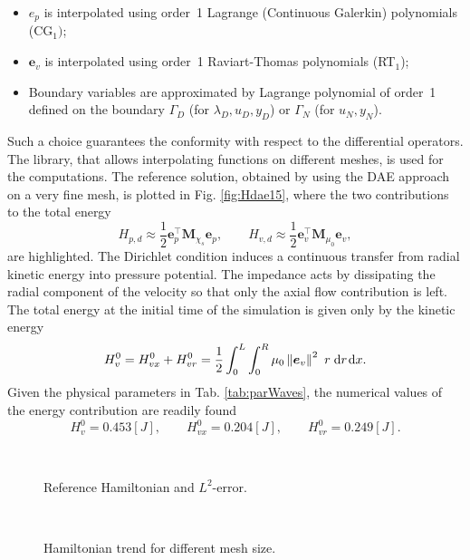 \begin{itemize}
	\item $e_p$ is interpolated using order~1 Lagrange (Continuous Galerkin) polynomials (CG$_1)$;
	\item $\bm{e}_v$ is interpolated using order~1 Raviart-Thomas polynomials (RT$_1$);
	\item Boundary variables are approximated by Lagrange polynomial of order~1 defined on the boundary $\Gamma_D$ (for $\lambda_D, u_D, y_D$) or $\Gamma_N$ (for $u_N, y_N$).
\end{itemize}

Such a choice guarantees the conformity with respect to the differential operators. The {} library, that allows interpolating functions on different meshes, is used for the computations. The reference solution, obtained by using the DAE approach on a very fine mesh, is plotted in Fig. \ref{fig:Hdae15}, where the two contributions to the total energy
\[
H_{p, d} \approx \frac{1}{2} \mathbf{e}_p^\top \mathbf{M}_{\chi_s} \mathbf{e}_p, \qquad H_{v, d} \approx \frac{1}{2} \mathbf{e}_v^\top \mathbf{M}_{\mu_0} \mathbf{e}_v, \]
are highlighted. The Dirichlet condition induces a continuous transfer from radial kinetic energy into pressure potential. The impedance acts by dissipating the radial component of the velocity so that only the axial flow contribution is left. The total energy at the initial time of the simulation is given only by the kinetic energy
\[
H_v^0 = H_{vx}^0 + H_{vr}^0 = \frac{1}{2} \int_{0}^L\int_{0}^R  \mu_0 \norm{\bm{e}_v}^2 \ r \d{r}\d{x}.
\]
Given the physical parameters in Tab. \ref{tab:parWaves}, the numerical values of the energy contribution are readily found
\[H_v^0 = 0.453 [J], \qquad H_{vx}^0 = 0.204 [J], \qquad H_{vr}^0 = 0.249 [J].\]

\begin{figure}[ht]%
	\centering
	\hspace{8pt}%
	 \\
	\caption[]{Reference Hamiltonian and $L^2$-error.}%
	\label{fig:Href_err}%
\end{figure}


\begin{figure}[ht]%
	\centering
	\hspace{8pt}%
	 \\
	\caption[]{Hamiltonian trend for different mesh size.}%
	\label{fig:Htrend}%
\end{figure}

